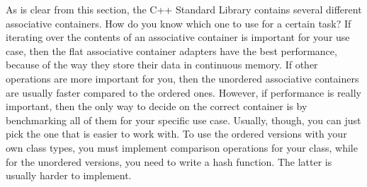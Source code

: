 As is clear from this section, the C++ Standard Library contains several different associative containers. How do you know which one to use for a certain task? If iterating over the contents of an associative container is important for your use case, then the flat associative container adapters have the best performance, because of the way they store their data in continuous memory. If other operations are more important for you, then the unordered associative containers are usually faster compared to the ordered ones. However, if performance is really important, then the only way to decide on the correct container is by benchmarking all of them for your specific use case. Usually, though, you can just pick the one that is easier to work with. To use the ordered versions with your own class types, you must implement comparison operations for your class, while for the unordered versions, you need to write a hash function. The latter is usually harder to implement.









